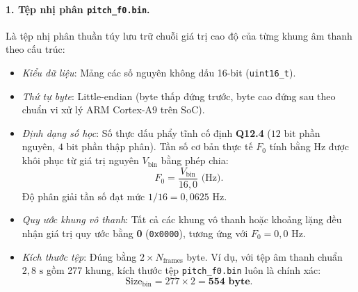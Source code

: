 \paragraph{1. Tệp nhị phân \texttt{pitch\_f0.bin}.}
Là tệp nhị phân thuần túy lưu trữ chuỗi giá trị cao độ của từng khung âm thanh theo cấu trúc:
\begin{itemize}
    \item \emph{Kiểu dữ liệu}: Mảng các số nguyên không dấu 16-bit (\texttt{uint16\_t}).
    \item \emph{Thứ tự byte}: Little-endian (byte thấp đứng trước, byte cao đứng sau theo chuẩn vi xử lý ARM Cortex-A9 trên SoC).
    \item \emph{Định dạng số học}: Số thực dấu phẩy tĩnh cố định \textbf{Q12.4} ($12\text{ bit}$ phần nguyên, $4\text{ bit}$ phần thập phân). Tần số cơ bản thực tế $F_0$ tính bằng Hz được khôi phục từ giá trị nguyên $V_{\text{bin}}$ bằng phép chia:
    \begin{equation}
        F_0 = \frac{V_{\text{bin}}}{16{,}0}\text{ (Hz)}.
    \end{equation}
    Độ phân giải tần số đạt mức $1/16 = 0{,}0625\text{ Hz}$.
    \item \emph{Quy ước khung vô thanh}: Tất cả các khung vô thanh hoặc khoảng lặng đều nhận giá trị quy ước bằng \textbf{0} (\texttt{0x0000}), tương ứng với $F_0 = 0{,}0\text{ Hz}$.
    \item \emph{Kích thước tệp}: Đúng bằng $2 \times N_{\text{frames}}$ byte. Ví dụ, với tệp âm thanh chuẩn $2{,}8\text{ s}$ gồm 277 khung, kích thước tệp \texttt{pitch\_f0.bin} luôn là chính xác:
    \begin{equation}
        \text{Size}_{\text{bin}} = 277 \times 2 = \mathbf{554\text{ byte}}.
    \end{equation}
\end{itemize}

